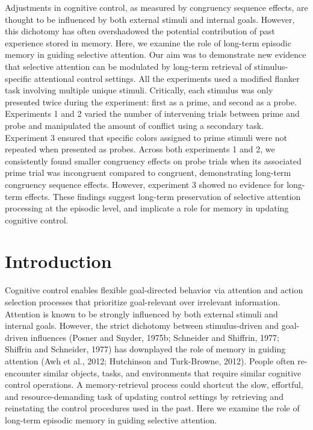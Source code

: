 \documentclass[]{DissertateCUNY}
\begin{document}
Adjustments in cognitive control, as measured by congruency sequence
effects, are thought to be influenced by both external stimuli and
internal goals. However, this dichotomy has often overshadowed the
potential contribution of past experience stored in memory. Here, we
examine the role of long-term episodic memory in guiding selective
attention. Our aim was to demonstrate new evidence that selective
attention can be modulated by long-term retrieval of stimulus-specific
attentional control settings. All the experiments used a modified
flanker task involving multiple unique stimuli. Critically, each
stimulus was only presented twice during the experiment: first as a
prime, and second as a probe. Experiments 1 and 2 varied the number of
intervening trials between prime and probe and manipulated the amount of
conflict using a secondary task. Experiment 3 ensured that specific
colors assigned to prime stimuli were not repeated when presented as
probes. Across both experiments 1 and 2, we consistently found smaller
congruency effects on probe trials when its associated prime trial was
incongruent compared to congruent, demonstrating long-term congruency
sequence effects. However, experiment 3 showed no evidence for long-term
effects. These findings suggest long-term preservation of selective
attention processing at the episodic level, and implicate a role for
memory in updating cognitive control.

\hypertarget{introduction-1}{%
\section{Introduction}\label{introduction-1}}

Cognitive control enables flexible goal-directed behavior via attention
and action selection processes that prioritize goal-relevant over
irrelevant information. Attention is known to be strongly influenced by
both external stimuli and internal goals. However, the strict dichotomy
between stimulus-driven and goal-driven influences (Posner and Snyder,
1975b; Schneider and Shiffrin, 1977; Shiffrin and Schneider, 1977) has
downplayed the role of memory in guiding attention (Awh et al., 2012;
Hutchinson and Turk-Browne, 2012). People often re-encounter similar
objects, tasks, and environments that require similar cognitive control
operations. A memory-retrieval process could shortcut the slow,
effortful, and resource-demanding task of updating control settings by
retrieving and reinstating the control procedures used in the past. Here
we examine the role of long-term episodic memory in guiding selective
attention.
\end{document}
